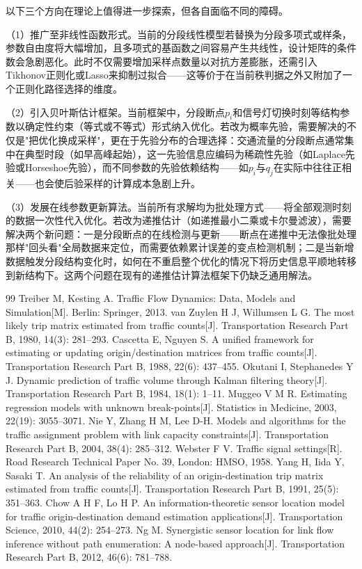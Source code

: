 \documentclass[UTF8,a4paper,fontset=none]{ctexart}
\newcommand{\xiaosi}{\fontsize{12pt}{24pt}\selectfont}
\numberwithin{equation}{section}
\begin{document}
以下三个方向在理论上值得进一步探索，但各自面临不同的障碍。

（1）推广至非线性函数形式。当前的分段线性模型若替换为分段多项式或样条，参数自由度将大幅增加，且多项式的基函数之间容易产生共线性，设计矩阵的条件数会急剧恶化。此时不仅需要增加采样点数量以对抗方差膨胀，还需引入Tikhonov正则化或Lasso来抑制过拟合——这等价于在当前秩判据之外又附加了一个正则化路径选择的维度。

（2）引入贝叶斯估计框架。当前框架中，分段断点$p_i$和信号灯切换时刻等结构参数以确定性约束（等式或不等式）形式纳入优化。若改为概率先验，需要解决的不仅是"把优化换成采样"，更在于先验分布的合理选择：交通流量的分段断点通常集中在典型时段（如早高峰起始），这一先验信息应编码为稀疏性先验（如Laplace先验或Horseshoe先验），而不同参数的先验依赖结构——如$p_i$与$q_j$在实际中往往正相关——也会使后验采样的计算成本急剧上升。

（3）发展在线参数更新算法。当前所有求解均为批处理方式——将全部观测时刻的数据一次性代入优化。若改为递推估计（如递推最小二乘或卡尔曼滤波），需要解决两个新问题：一是分段断点的在线检测与更新——断点在递推中无法像批处理那样"回头看"全局数据来定位，而需要依赖累计误差的变点检测机制；二是当新增数据触发分段结构变化时，如何在不重启整个优化的情况下将历史信息平顺地转移到新结构下。这两个问题在现有的递推估计算法框架下仍缺乏通用解法。

\clearpage
\begingroup
\singlespacing
\xiaosi
\raggedright
\begin{thebibliography}{99}
\setlength{\itemsep}{0pt}
\setlength{\parsep}{0pt}
 Treiber M, Kesting A. Traffic Flow Dynamics: Data, Models and Simulation[M]. Berlin: Springer, 2013.
 van Zuylen H J, Willumsen L G. The most likely trip matrix estimated from traffic counts[J]. Transportation Research Part B, 1980, 14(3): 281--293.
 Cascetta E, Nguyen S. A unified framework for estimating or updating origin/destination matrices from traffic counts[J]. Transportation Research Part B, 1988, 22(6): 437--455.
 Okutani I, Stephanedes Y J. Dynamic prediction of traffic volume through Kalman filtering theory[J]. Transportation Research Part B, 1984, 18(1): 1--11.
 Muggeo V M R. Estimating regression models with unknown break-points[J]. Statistics in Medicine, 2003, 22(19): 3055--3071.
 Nie Y, Zhang H M, Lee D-H. Models and algorithms for the traffic assignment problem with link capacity constraints[J]. Transportation Research Part B, 2004, 38(4): 285--312.
 Webster F V. Traffic signal settings[R]. Road Research Technical Paper No. 39, London: HMSO, 1958.
 Yang H, Iida Y, Sasaki T. An analysis of the reliability of an origin-destination trip matrix estimated from traffic counts[J]. Transportation Research Part B, 1991, 25(5): 351--363.
 Chow A H F, Lo H P. An information-theoretic sensor location model for traffic origin-destination demand estimation applications[J]. Transportation Science, 2010, 44(2): 254--273.
 Ng M. Synergistic sensor location for link flow inference without path enumeration: A node-based approach[J]. Transportation Research Part B, 2012, 46(6): 781--788.
\end{thebibliography}
\endgroup
\end{document}

